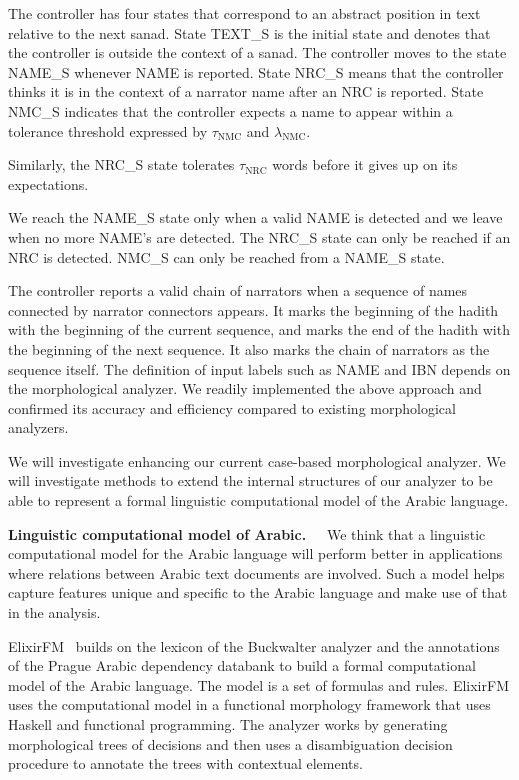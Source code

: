 \documentclass[12pt]{article}
\begin{document}
The controller has four states that correspond to 
an abstract position in text relative to the next sanad. 
State TEXT\_S is the initial state and denotes that
the controller is outside the context of a sanad.
The controller moves to the state NAME\_S whenever
NAME is reported.
State NRC\_S means that the controller thinks it is in the context
of a narrator name after an NRC is reported.
State NMC\_S
indicates that the controller expects a name to appear within 
a tolerance threshold expressed by 
$\tau_{\mbox{NMC}}$ and $\lambda_{\mbox{NMC}}$.

Similarly, the NRC\_S state tolerates $\tau_{\mbox{NRC}}$ words 
before it gives up on its expectations. 

We reach the NAME\_S state only when a
valid NAME is detected and we leave when no more NAME's 
are detected. 
The NRC\_S state can only be reached if an NRC is detected.
NMC\_S can only be reached from a NAME\_S state.

The controller reports a valid chain of narrators when a 
sequence of names
connected by narrator connectors appears. 
It marks the beginning of the hadith with the beginning of the 
current sequence,
and marks the end of the hadith with the beginning of the next 
sequence. 
It also marks the chain of narrators as the sequence itself. 
The definition of input labels such as NAME and IBN depends on 
the morphological analyzer. 
We readily implemented the above approach and confirmed its 
accuracy and efficiency compared to existing morphological
analyzers. 

We will investigate enhancing our current case-based morphological
analyzer.
We will investigate methods to extend the internal structures 
of our analyzer to be able to represent a formal linguistic
computational model of the Arabic language. 

{\bf Linguistic computational model of Arabic.~~}
We think that a linguistic computational model for the Arabic
language will perform better in applications where
relations between Arabic text documents are involved. 
Such a model helps capture features unique and specific 
to the Arabic language and make use of that in the analysis.

ElixirFM~\cite{Otakar:07} builds on the lexicon
of the Buckwalter analyzer and the annotations of the 
Prague Arabic dependency databank to build a formal 
computational model of the Arabic language.
The model is a set of formulas and rules. 
ElixirFM uses the computational model in a functional
morphology framework that uses Haskell and functional
programming. 
The analyzer works by generating morphological trees of 
decisions and then uses a disambiguation decision procedure 
to annotate the trees with contextual elements. 
\end{document}
